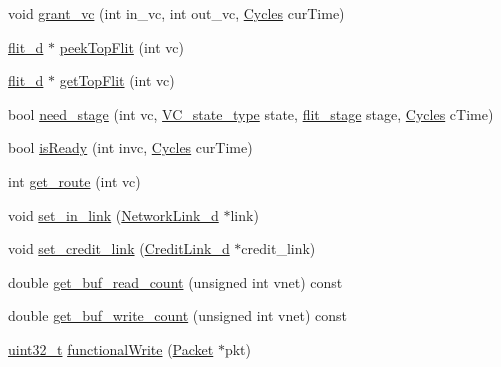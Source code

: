 \begin{DoxyCompactItemize}
\item 
void \hyperlink{classInputUnit__d_ae8228408b44a2088e7aa6fac6548f09c}{grant\_\-vc} (int in\_\-vc, int out\_\-vc, \hyperlink{classCycles}{Cycles} curTime)
\item 
\hyperlink{classflit__d}{flit\_\-d} $\ast$ \hyperlink{classInputUnit__d_a52ab0f3b8ab7d8161346a1ddfc53e09f}{peekTopFlit} (int vc)
\item 
\hyperlink{classflit__d}{flit\_\-d} $\ast$ \hyperlink{classInputUnit__d_a3ca1c95b6303e0ddfe2e016a8d2bd4b4}{getTopFlit} (int vc)
\item 
bool \hyperlink{classInputUnit__d_ad41c4d2863462e8f6435be6ae77accea}{need\_\-stage} (int vc, \hyperlink{NetworkHeader_8hh_aaafaa208359111dcd9f4d47ff377da76}{VC\_\-state\_\-type} state, \hyperlink{NetworkHeader_8hh_a1af1206699d48009a5cbd0c2c1d7ce15}{flit\_\-stage} stage, \hyperlink{classCycles}{Cycles} cTime)
\item 
bool \hyperlink{classInputUnit__d_a6651ea70e8d93b6a54fcded1aa9355eb}{isReady} (int invc, \hyperlink{classCycles}{Cycles} curTime)
\item 
int \hyperlink{classInputUnit__d_a98ae815c1cb608efc87754d70f735691}{get\_\-route} (int vc)
\item 
void \hyperlink{classInputUnit__d_aae75fe48fb1bda1d0df405f7913467d9}{set\_\-in\_\-link} (\hyperlink{classNetworkLink__d}{NetworkLink\_\-d} $\ast$link)
\item 
void \hyperlink{classInputUnit__d_aa66db9bde5f92aad3f5bbc61cc861d2a}{set\_\-credit\_\-link} (\hyperlink{classCreditLink__d}{CreditLink\_\-d} $\ast$credit\_\-link)
\item 
double \hyperlink{classInputUnit__d_a01aa7a2e66e9ffe94fa3edb16578424d}{get\_\-buf\_\-read\_\-count} (unsigned int vnet) const 
\item 
double \hyperlink{classInputUnit__d_afd026850992292ca2b7efc6786fe5cc8}{get\_\-buf\_\-write\_\-count} (unsigned int vnet) const 
\item 
\hyperlink{Type_8hh_a435d1572bf3f880d55459d9805097f62}{uint32\_\-t} \hyperlink{classInputUnit__d_ad07b9def1d6f5e5f988a254c3a9d1ad9}{functionalWrite} (\hyperlink{classPacket}{Packet} $\ast$pkt)
\end{DoxyCompactItemize}
